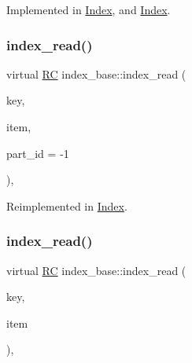 Implemented in \hyperlink{classIndex_abb1666dd897887f22d8e4dc92966b207}{Index}, and \hyperlink{classIndex_abb1666dd897887f22d8e4dc92966b207}{Index}.

\mbox{\label{classindex__base_a044a748df8945a60af8ab815b555960a}} 
\subsubsection{\texorpdfstring{index\+\_\+read()}{index\_read()}\hspace{0.1cm}{\footnotesize\ttfamily [2/3]}}
{\footnotesize\ttfamily virtual \hyperlink{global_8h_a78c49a674c810fdd03d20432f7be864a}{RC} index\+\_\+base\+::index\+\_\+read (\begin{DoxyParamCaption}\item[{\hyperlink{index__base_8h_ae35c40bc2f912c11f0e36ac66cba4489}{K\+E\+Y\+\_\+\+T\+Y\+PE}}]{key,  }\item[{\hyperlink{microbench_2main_8cpp_ae17cb099b4c9aee7835032339b5a9e0d}{V\+A\+L\+U\+E\+\_\+\+T\+Y\+PE} $\ast$}]{item,  }\item[{int}]{part\+\_\+id = {\ttfamily -\/1} }\end{DoxyParamCaption})\hspace{0.3cm}{\ttfamily [inline]}, {\ttfamily [virtual]}}



Reimplemented in \hyperlink{classIndex_ab930b74f611f4704fa1fb9a8bb9f57f8}{Index}.

\mbox{\label{classindex__base_aa51e3945ff304a47364499c3e716a87f}} 
\subsubsection{\texorpdfstring{index\+\_\+read()}{index\_read()}\hspace{0.1cm}{\footnotesize\ttfamily [3/3]}}
{\footnotesize\ttfamily virtual \hyperlink{global_8h_a78c49a674c810fdd03d20432f7be864a}{RC} index\+\_\+base\+::index\+\_\+read (\begin{DoxyParamCaption}\item[{\hyperlink{index__base_8h_ae35c40bc2f912c11f0e36ac66cba4489}{K\+E\+Y\+\_\+\+T\+Y\+PE}}]{key,  }\item[{\hyperlink{microbench_2main_8cpp_ae17cb099b4c9aee7835032339b5a9e0d}{V\+A\+L\+U\+E\+\_\+\+T\+Y\+PE} $\ast$}]{item }\end{DoxyParamCaption})\hspace{0.3cm}{\ttfamily [inline]}, {\ttfamily [virtual]}}

